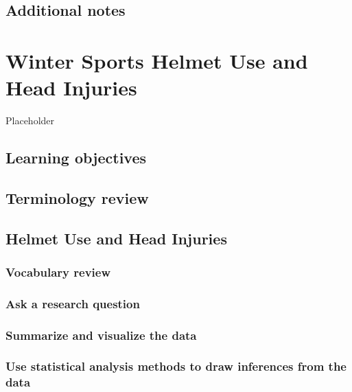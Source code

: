 \documentclass[
]{report}
\begin{document}
\hypertarget{additional-notes}{%
\section{Additional notes}\label{additional-notes}}

\hypertarget{winter-sports-helmet-use-and-head-injuries}{%
\chapter{Winter Sports Helmet Use and Head Injuries}\label{winter-sports-helmet-use-and-head-injuries}}

Placeholder

\hypertarget{learning-objectives}{%
\section{Learning objectives}\label{learning-objectives}}

\hypertarget{terminology-review}{%
\section{Terminology review}\label{terminology-review}}

\hypertarget{helmet-use-and-head-injuries}{%
\section{Helmet Use and Head Injuries}\label{helmet-use-and-head-injuries}}

\hypertarget{vocabulary-review}{%
\subsection{Vocabulary review}\label{vocabulary-review}}

\hypertarget{ask-a-research-question}{%
\subsection{Ask a research question}\label{ask-a-research-question}}

\hypertarget{summarize-and-visualize-the-data}{%
\subsection{Summarize and visualize the data}\label{summarize-and-visualize-the-data}}

\hypertarget{use-statistical-analysis-methods-to-draw-inferences-from-the-data}{%
\subsection{Use statistical analysis methods to draw inferences from the data}\label{use-statistical-analysis-methods-to-draw-inferences-from-the-data}}
\end{document}
